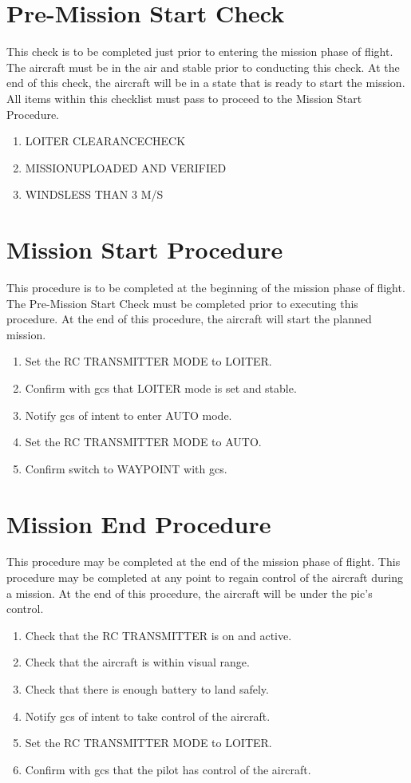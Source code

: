 \documentclass{report}
\begin{document}
	\section{Pre-Mission Start Check}
		This check is to be completed just prior to entering the mission phase of flight.  The aircraft must be in the air and stable prior to conducting this check.  At the end of this check, the aircraft will be in a state that is ready to start the mission.  All items within this checklist must pass to proceed to the Mission Start Procedure.
		\begin{enumerate}
			\item LOITER CLEARANCE\hrulefill CHECK
			\item MISSION\hrulefill UPLOADED AND VERIFIED
			\item WINDS\hrulefill LESS THAN 3 M/S
		\end{enumerate}
	\section{Mission Start Procedure}
		This procedure is to be completed at the beginning of the mission phase of flight.  The Pre-Mission Start Check must be completed prior to executing this procedure.  At the end of this procedure, the aircraft will start the planned mission.
		\begin{enumerate}
			\item Set the RC TRANSMITTER MODE to LOITER.
			\item Confirm with \gls{gcs} that LOITER mode is set and stable.
			\item Notify \gls{gcs} of intent to enter AUTO mode.
			\item Set the RC TRANSMITTER MODE to AUTO.
			\item Confirm switch to WAYPOINT with \gls{gcs}.
		\end{enumerate}
	\section{Mission End Procedure}
		This procedure may be completed at the end of the mission phase of flight.  This procedure may be completed at any point to regain control of the aircraft during a mission.  At the end of this procedure, the aircraft will be under the \gls{pic}'s control.
		\begin{enumerate}
			\item Check that the RC TRANSMITTER is on and active.
			\item Check that the aircraft is within visual range.
			\item Check that there is enough battery to land safely.
			\item Notify \gls{gcs} of intent to take control of the aircraft.
			\item Set the RC TRANSMITTER MODE to LOITER.
			\item Confirm with \gls{gcs} that the pilot has control of the aircraft.
		\end{enumerate}
\end{document}
